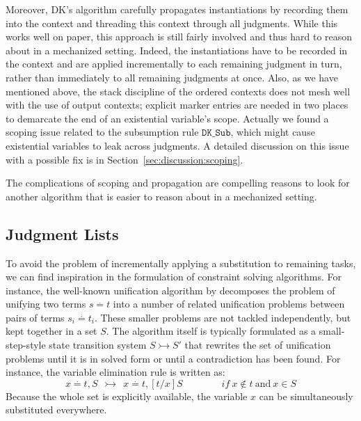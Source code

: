 Moreover, DK's algorithm carefully propagates instantiations by recording them
into the context and threading this context through all judgments. 
While this works well on paper, this approach is still fairly involved and thus
hard to reason about in a mechanized setting. Indeed, the instantiations have
to be recorded in the context and are applied incrementally to each remaining
judgment in turn, rather than immediately to all remaining judgments at once.
Also, as we have mentioned above, the stack discipline of the ordered contexts
does not mesh well with the use of output contexts; explicit marker entries are
needed in two places to demarcate the end of an existential variable's scope.
Actually we found a scoping issue related to the subsumption rule $\mathtt{DK\_Sub}$,
which might cause existential variables to leak across judgments.
A detailed discussion on this issue with a possible fix is in Section~\ref{sec:discussion:scoping}.

The complications of scoping and propagation are compelling reasons
to look for another algorithm that is easier to
reason about in a mechanized setting.


\subsection{Judgment Lists}\label{sec:overview:list}
To avoid the problem of incrementally applying a substitution to remaining
tasks, we can find inspiration in the formulation of constraint solving
algorithms. For instance, the well-known unification
algorithm by \citet{unification} decomposes the problem of unifying two terms $s \stackrel{.}{=} t$ into a number
of related unification problems between pairs of terms $s_i \stackrel{.}{=} t_i$. These smaller
problems are not tackled independently, but kept together in a set $S$. 
The algorithm itself is typically formulated as a small-step-style state
transition system $S \rightarrowtail S'$ that rewrites the set of unification
problems until it is in solved form or until a contradiction has been found.
For instance, the variable elimination rule is written as:
\[
   x \stackrel{.}{=} t, S  ~~\rightarrowtail~~  x \stackrel{.}{=} t, [t/x]S   \qquad\qquad{if}~x \not\in t~\text{and}~{x \in S}
\]
Because the whole set is explicitly available, the variable $x$ can be
simultaneously substituted everywhere.

